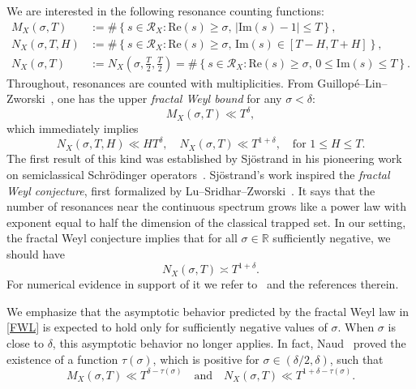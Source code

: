 \documentclass[12pt,letterpaper]{amsart}
\theoremstyle{plain}
\theoremstyle{definition}
\theoremstyle{remark}
\begin{document}
We are interested in the following resonance counting functions:
\begin{align}
M_X(\sigma,T) &:= \#\left\{ s \in \mathcal{R}_X : \mathrm{Re}(s) \ge \sigma,\, \vert \mathrm{Im}(s) - 1 \vert \le T \right\}, \label{defi:MX} \\
N_X(\sigma,T,H) &:= \#\left\{ s \in \mathcal{R}_X : \mathrm{Re}(s) \ge \sigma,\, \mathrm{Im}(s) \in [T - H, T + H] \right\}, \label{defi:NXTH} \\
N_X(\sigma,T) &:= N_X\left(\sigma, \frac{T}{2}, \frac{T}{2} \right) = \#\left\{ s \in \mathcal{R}_X : \mathrm{Re}(s) \ge \sigma,\, 0 \le \mathrm{Im}(s) \le T \right\}. \label{defi:NX}
\end{align}
Throughout, resonances are counted with multiplicities. From Guillopé--Lin--Zworski~\cite{GLZ}, one has the upper \textit{fractal Weyl bound} for any $\sigma < \delta$:
\begin{equation}\label{intro:GLZ}
M_X(\sigma,T) \ll T^\delta,
\end{equation}
which immediately implies
\[
N_X(\sigma,T,H) \ll H T^\delta, \quad N_X(\sigma,T) \ll T^{1 + \delta}, \quad \text{for } 1 \le H \le T.
\]
The first result of this kind was established by Sj\"ostrand in his pioneering work on semiclassical Schr\"odinger operators~\cite{Sjoestrand}. Sj\"ostrand's work inspired the \textit{fractal Weyl conjecture}, first formalized by Lu--Sridhar--Zworski~\cite{Lu_Sridhar_Zworski}. It says that the number of resonances near the continuous spectrum grows like a power law with exponent equal to half the dimension of the classical trapped set. In our setting, the fractal Weyl conjecture implies that for all $\sigma \in \mathbb{R}$ sufficiently negative, we should have
\begin{equation}\label{FWL}
N_X(\sigma,T) \asymp T^{1+\delta}.
\end{equation}
For numerical evidence in support of it we refer to~\cite[Chapter~16]{Borthwick_book} and the references therein.

We emphasize that the asymptotic behavior predicted by the fractal Weyl law in \eqref{FWL} is expected to hold only for sufficiently negative values of \(\sigma\). When \(\sigma\) is close to \(\delta\), this asymptotic behavior no longer applies. In fact, Naud~\cite{Naud14} proved the existence of a function \(\tau(\sigma)\), which is positive for \(\sigma \in (\delta/2, \delta)\), such that
\begin{equation}\label{intro:Naud}
M_X(\sigma,T) \ll T^{\delta - \tau(\sigma)} \quad \text{and} \quad N_X(\sigma,T) \ll T^{1 + \delta - \tau(\sigma)}.
\end{equation}
\end{document}
